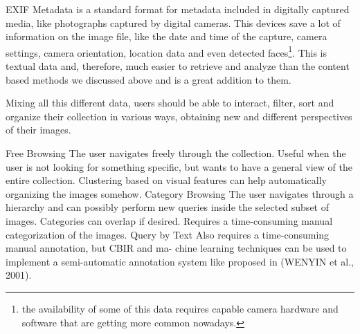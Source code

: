 EXIF Metadata is a standard format for metadata included in digitally captured media, like photographs captured by digital cameras. This devices save a lot of information on the image file, like the date and time of the capture, camera settings, camera orientation, location data and even detected faces\footnote{the availability of some of this data requires capable camera hardware and software that are getting more common nowadays.}. This is textual data and, therefore, much easier to retrieve and analyze than the content based methods we discussed above and is a great addition to them.

Mixing all this different data, users should be able to interact, filter, sort and organize their collection in various ways, obtaining new and different perspectives of their images.






Free Browsing The user navigates freely through the collection. Useful when the user is not looking for something specific, but wants to have a general view of the entire collection. Clustering based on visual features can help automatically organizing the images somehow.
Category Browsing The user navigates through a hierarchy and can possibly perform new queries inside the selected subset of images. Categories can overlap if desired. Requires a time-consuming manual categorization of the images.
Query by Text Also requires a time-consuming manual annotation, but CBIR and ma- chine learning techniques can be used to implement a semi-automatic annotation system like proposed in (WENYIN et al., 2001).




